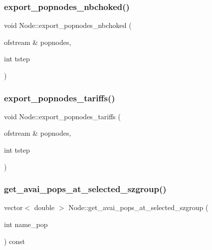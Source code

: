 \mbox{\label{class_node_af2d5f3b07a95ee360df6cfa1b2d6da59}} 
\subsubsection{\texorpdfstring{export\_popnodes\_nbchoked()}{export\_popnodes\_nbchoked()}}
{\footnotesize\ttfamily void Node\+::export\+\_\+popnodes\+\_\+nbchoked (\begin{DoxyParamCaption}\item[{ofstream \&}]{popnodes,  }\item[{int}]{tstep }\end{DoxyParamCaption})}

\mbox{\label{class_node_a817e8f2ae1fc3395c02a67efcce724a8}} 
\subsubsection{\texorpdfstring{export\_popnodes\_tariffs()}{export\_popnodes\_tariffs()}}
{\footnotesize\ttfamily void Node\+::export\+\_\+popnodes\+\_\+tariffs (\begin{DoxyParamCaption}\item[{ofstream \&}]{popnodes,  }\item[{int}]{tstep }\end{DoxyParamCaption})}

\mbox{\label{class_node_a3a644221518403e5b26c935b847b6a4c}} 
\subsubsection{\texorpdfstring{get\_avai\_pops\_at\_selected\_szgroup()}{get\_avai\_pops\_at\_selected\_szgroup()}}
{\footnotesize\ttfamily vector$<$ double $>$ Node\+::get\+\_\+avai\+\_\+pops\+\_\+at\+\_\+selected\+\_\+szgroup (\begin{DoxyParamCaption}\item[{int}]{name\+\_\+pop }\end{DoxyParamCaption}) const}

